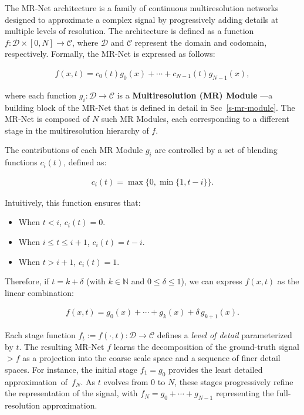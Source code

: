 The MR-Net architecture is a family of continuous multiresolution networks designed to approximate a complex signal by progressively adding details at multiple levels of resolution. The architecture is defined as a function \( f:\mathcal{D} \times [0,N] \to \mathcal{C} \), where \(\mathcal{D}\) and \(\mathcal{C}\) represent the domain and codomain, respectively. Formally, the MR-Net is expressed as follows:

\begin{align}\label{e-mrnet}
f(x,t) = c_0(t) g_0(x) + \cdots + c_{N-1}(t) g_{N-1}(x),
\end{align}

where each function \( g_i : \mathcal{D} \to \mathcal{C} \) is a \textbf{Multiresolution (MR) Module} —a building block of the MR-Net that is defined in detail in Sec~\ref{s-mr-module}. The MR-Net is composed of \( N \) such MR Modules, each corresponding to a different stage in the multiresolution hierarchy of \( f \). 

The contributions of each MR Module \( g_i \) are controlled by a set of blending functions \( c_i(t) \), defined as:

\begin{align}\label{e-control}
c_i(t) = \max \Big\{ 0, \min \big\{ 1, t - i \big\} \Big\}.
\end{align}

Intuitively, this function ensures that:

\begin{itemize}
    \item When \( t < i \), \( c_i(t) = 0 \).
    \item When \( i \leq t \leq i+1 \), \( c_i(t) = t - i \).
    \item When \( t > i + 1 \), \( c_i(t) = 1 \).
\end{itemize}

Therefore, if \( t = k + \delta \) (with \( k \in \mathbb{N} \) and \( 0 \leq \delta \leq 1 \)), we can express \( f(x, t) \) as the linear combination:

\begin{align}
f(x, t) = g_0(x) + \cdots + g_k(x) + \delta \, g_{k+1}(x).
\end{align}

Each stage function \( f_t := f(\cdot, t) : \mathcal{D} \to \mathcal{C} \) defines a \textit{level of detail} parameterized by \( t \). The resulting MR-Net $f$ learns the decomposition of the ground-truth signal $\gt{f}$ as a projection into the coarse scale space and a sequence of finer detail spaces. For instance, the initial stage $f_1=g_0$ provides the least detailed approximation~of~$f_N$. As \( t \) evolves from 0 to \( N \), these stages progressively refine the representation of the signal, with \( f_N = g_0 + \cdots + g_{N-1} \) representing the full-resolution approximation.

